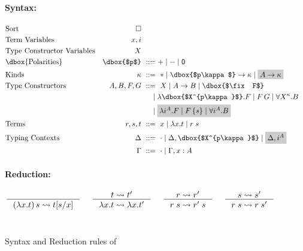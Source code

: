 \begin{figure}\begin{singlespace}
	\small
\paragraph{Syntax:}
\begin{align*}
\!\!\!\!\!\!\!\!&\text{Sort}
 	& \square
	\\
\!\!\!\!\!\!\!\!&\text{Term Variables}
 	& x,i
\\
\!\!\!\!\!\!\!\!&\text{Type Constructor Variables}
 	& X
\\
\!\!\!\!\!\!\!\!&\text{\dbox{Polarities}}
	& \dbox{$p$} &~ ::= + \mid - \mid \mathsf{0}
\\
\!\!\!\!\!\!\!\!&\text{Kinds}
 	& \kappa		&~ ::= ~ *
				\mid \dbox{$p\kappa$} -> \kappa
				\mid \newFi{A -> \kappa}
\\
\!\!\!\!\!\!\!\!&\text{Type Constructors}
	& A,B,F,G		&~ ::= ~ X
				\mid A -> B
				\mid \dbox{$\fix F$} \\ &&& ~\quad
				\mid \lambda \dbox{$X^{p\kappa}$}.F
				\mid F\,G
				\mid \forall X^\kappa . B \\ &&& ~\quad
				\mid \newFi{\lambda i^A.F
				\mid F\,\{s\}
				\mid \forall i^A . B}
\\
\!\!\!\!\!\!\!\!&\text{Terms}
	& r,s,t			&~ ::= ~ x \mid \lambda x.t \mid r\;s
\\
\!\!\!\!\!\!\!\!&\text{Typing Contexts}
	& \Delta		&~ ::= ~ \cdot
				\mid \Delta,\dbox{$X^{p\kappa}$}
				\mid \newFi{\Delta, i^A} \\
&	& \Gamma		&~ ::= ~ \cdot
				\mid \Gamma, x : A
\end{align*}
\paragraph{Reduction:} 
\[ 
   \inference{}{(\lambda x.t)\,s \rightsquigarrow t[s/x]}
 ~~~~
   \inference{t \rightsquigarrow t'}{\lambda x.t \rightsquigarrow \lambda x.t'}
 ~~~~
   \inference{r \rightsquigarrow r'}{r\;s \rightsquigarrow r'\;s}
 ~~~~
   \inference{s \rightsquigarrow s'}{r\;s \rightsquigarrow r\;s'}
\]
~\\
\end{singlespace}
\caption{Syntax and Reduction rules of \Fixi}
\label{fig:Fixi}
\end{figure}

